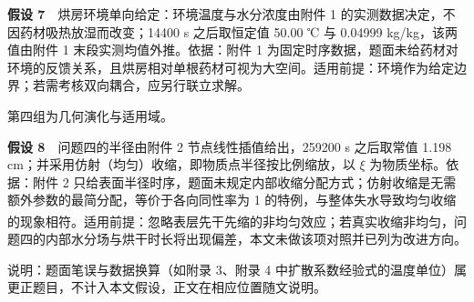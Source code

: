 \textbf{假设 7}　烘房环境单向给定：环境温度与水分浓度由附件 1 的实测数据决定，不因药材吸热放湿而改变；14400 s 之后取恒定值 50.00 ℃ 与 0.04999 kg/kg，该两值由附件 1 末段实测均值外推。依据：附件 1 为固定时序数据，题面未给药材对环境的反馈关系，且烘房相对单根药材可视为大空间。适用前提：环境作为给定边界；若需考核双向耦合，应另行联立求解。

第四组为几何演化与适用域。

\textbf{假设 8}　问题四的半径由附件 2 节点线性插值给出，259200 s 之后取常值 1.198 cm；并采用仿射（均匀）收缩，即物质点半径按比例缩放，以 $\xi$ 为物质坐标。依据：附件 2 只给表面半径时序，题面未规定内部收缩分配方式；仿射收缩是无需额外参数的最简分配，等价于各向同性率为 1 的特例，与整体失水导致均匀收缩的现象相符\textsuperscript{\cite{ref4,ref7}}。适用前提：忽略表层先干先缩的非均匀效应；若真实收缩非均匀，问题四的内部水分场与烘干时长将出现偏差，本文未做该项对照并已列为改进方向。

说明：题面笔误与数据换算（如附录 3、附录 4 中扩散系数经验式的温度单位）属更正题目，不计入本文假设，正文在相应位置随文说明。
